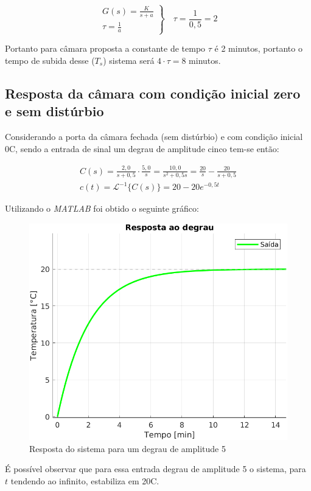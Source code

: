 \documentclass[a4paper,12pt]{article}
\begin{document}
		\begin{equation}
			\left.
			\begin{array}{c}
				\displaystyle G(s) = \frac{K}{s+a} \\[20pt]
				\displaystyle \tau = \frac{1}{a}
			\end{array}
			\right\}
			\quad \tau = \frac{1}{0,5} = 2
		\end{equation}
	
		Portanto para câmara proposta a constante de tempo $\tau$ é 2 minutos, portanto o tempo de subida desse ($T_s$) sistema será $4 \cdot \tau = 8$ minutos.
	
	\subsection{Resposta da câmara com condição inicial zero e sem distúrbio}
		Considerando a porta da câmara fechada (sem distúrbio) e com condição inicial 0\degree C, sendo a entrada de sinal um degrau de amplitude cinco tem-se então:
		

		\begin{gather}
			C(s) = \frac{2,0}{s+0,5} \cdot \frac{5,0}{s} = \frac{10,0}{s^2 + 0,5s} = \frac{20}{s} - \frac{20}{s+0,5} \\[20pt]
			c(t) = \mathcal{L}^{-1} \{ C(s) \} = 20 - 20e^{-0,5t}
		\end{gather}
	
		Utilizando o \textit{MATLAB} foi obtido o seguinte gráfico:
		
		\begin{figure}[H]
			\centering
			\includegraphics[width=0.5\linewidth]{images/respb.png}
			\caption{Resposta do sistema para um degrau de amplitude 5}
			\label{fig:resposta_b}
		\end{figure}
	
		É possível observar que para essa entrada degrau de amplitude 5 o sistema, para $t$ tendendo ao infinito, estabiliza em 20\degree C.
		
\end{document}
